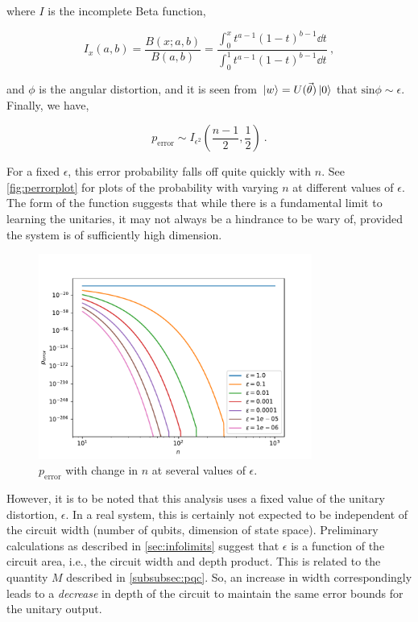 where \(I\) is the incomplete Beta function, 

\begin{equation}
    I_x(a, b) = \frac{B(x; a, b)}{B(a, b)} = \frac{\int_0^x t^{a-1} (1-t)^{b-1} \dd t}{\int_0^1 t^{a-1} (1-t)^{b-1} \dd t}~,
\end{equation}

and \(\phi\) is the angular distortion, and it is seen from \(\ket*{w} =
U(\vec{\theta})\ket*{0}\) that \(\text{sin} \phi \sim \epsilon\). Finally, we
have,

\begin{equation}
    p_{\text{error}} \sim I_{\epsilon^2}(\frac{n-1}{2}, \frac{1}{2})~.
\end{equation}

For a fixed \(\epsilon\), this error probability falls off quite quickly with
\(n\). See \autoref{fig:perrorplot} for plots of the probability with varying
\(n\) at different values of \(\epsilon\). The form of the function suggests
that while there is a fundamental limit to learning the unitaries, it may not
always be a hindrance to be wary of, provided the system is of sufficiently
high dimension.

\begin{figure}
    \centering
    \includegraphics[width=0.8\textwidth]{figures/perrorplot.pdf}
    \caption{\(p_{\text{error}}\) with change in \(n\) at several values of \(\epsilon\).}
    \label{fig:perrorplot}
\end{figure}

However, it is to be noted that this analysis uses a fixed value of the unitary
distortion, \(\epsilon\). In a real system, this is certainly not expected to be
independent of the circuit width (number of qubits, dimension of state space).
Preliminary calculations as described in \autoref{sec:infolimits} suggest that
\(\epsilon\) is a function of the circuit area, i.e., the circuit width and
depth product. This is related to the quantity \(M\) described in
\autoref{subsubsec:pqc}. So, an increase in width correspondingly leads to a
\emph{decrease} in depth of the circuit to maintain the same error bounds for
the unitary output.

